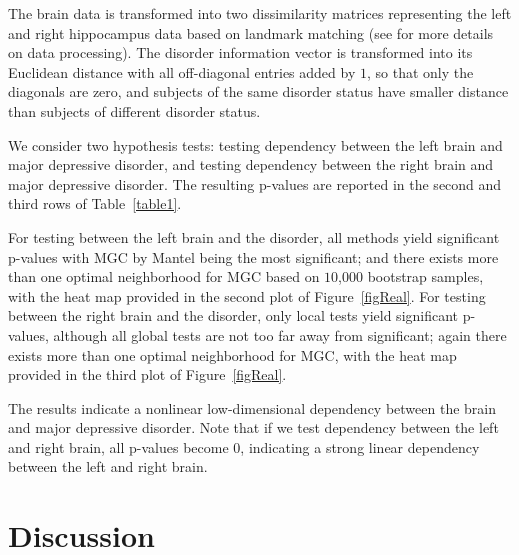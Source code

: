\documentclass[11pt]{article}
\begin{document}
The brain data is transformed into two dissimilarity matrices representing the left and right hippocampus data based on landmark matching (see \cite{ParkEtAl2011} for more details on data processing). The disorder information vector is transformed into its Euclidean distance with all off-diagonal entries added by $1$, so that only the diagonals are zero, and subjects of the same disorder status have smaller distance than subjects of different disorder status.

We consider two hypothesis tests: testing dependency between the left brain and major depressive disorder, and testing dependency between the right brain and major depressive disorder. The resulting p-values are reported in the second and third rows of Table~\ref{table1}.

For testing between the left brain and the disorder, all methods yield significant p-values with MGC by Mantel being the most significant; and there exists more than one optimal neighborhood for MGC based on $10$,$000$ bootstrap samples, with the heat map provided in the second plot of Figure~\ref{figReal}. For testing between the right brain and the disorder, only local tests yield significant p-values, although all global tests are not too far away from significant; again there exists more than one optimal neighborhood for MGC, with the heat map provided in the third plot of Figure~\ref{figReal}. 


The results indicate a nonlinear low-dimensional dependency between the brain and major depressive disorder. Note that if we test dependency between the left and right brain, all p-values become $0$, indicating a strong linear dependency between the left and right brain.

\section{Discussion}
\label{conclu}
\end{document}
